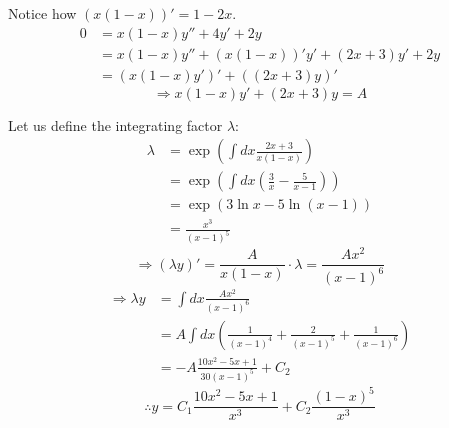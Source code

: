 \item

Notice how $(x(1 - x))' = 1 - 2x$.
\begin{align*}
	0
	 & = x(1 - x) y'' + 4y' + 2y                          \\
	 & = x(1 - x) y'' + (x(1 - x))' y' + (2x + 3) y' + 2y \\
	 & = (x(1 - x)y')' + ((2x + 3)y)'
\end{align*}
\[
	\Rightarrow x(1 - x)y' + (2x + 3)y = A
\]

Let us define the integrating factor $\lambda$:
\begin{align*}
	\lambda
	 & = \exp \left( \int dx \frac{2x + 3}{x(1 - x)} \right)                      \\
	 & = \exp \left( \int dx \left( \frac{3}{x} - \frac{5}{x - 1} \right) \right) \\
	 & = \exp \left( 3 \ln x - 5 \ln (x - 1) \right)                              \\
	 & = \frac{x^3}{{(x - 1)}^5}
\end{align*}
\[
	\Rightarrow (\lambda y)' = \frac{A}{x(1 - x)} \cdot \lambda = \frac{Ax^2}{{(x - 1)}^6}
\]
\begin{align*}
	\Rightarrow \lambda y
	 & = \int dx \frac{Ax^2}{{(x - 1)}^6}                                                               \\
	 & = A \int dx \left( \frac{1}{{(x - 1)}^4} + \frac{2}{{(x - 1)}^5} + \frac{1}{{(x - 1)}^6} \right) \\
	 & = -A \frac{10x^2 - 5x + 1}{30 {(x - 1)}^5} + C_2
\end{align*}
\[
	\therefore y = C_1 \frac{10x^2 - 5x + 1}{x^3} + C_2 \frac{{(1 - x)}^5}{x^3}
\]
